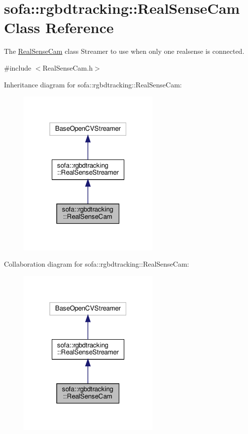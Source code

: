 \hypertarget{classsofa_1_1rgbdtracking_1_1_real_sense_cam}{}\section{sofa\+:\+:rgbdtracking\+:\+:Real\+Sense\+Cam Class Reference}
\label{classsofa_1_1rgbdtracking_1_1_real_sense_cam}


The \hyperlink{classsofa_1_1rgbdtracking_1_1_real_sense_cam}{Real\+Sense\+Cam} class Streamer to use when only one realsense is connected.  




{\ttfamily \#include $<$Real\+Sense\+Cam.\+h$>$}



Inheritance diagram for sofa\+:\+:rgbdtracking\+:\+:Real\+Sense\+Cam\+:
\nopagebreak
\begin{figure}[H]
\begin{center}
\leavevmode
\includegraphics[width=196pt]{classsofa_1_1rgbdtracking_1_1_real_sense_cam__inherit__graph}
\end{center}
\end{figure}


Collaboration diagram for sofa\+:\+:rgbdtracking\+:\+:Real\+Sense\+Cam\+:
\nopagebreak
\begin{figure}[H]
\begin{center}
\leavevmode
\includegraphics[width=196pt]{classsofa_1_1rgbdtracking_1_1_real_sense_cam__coll__graph}
\end{center}
\end{figure}
